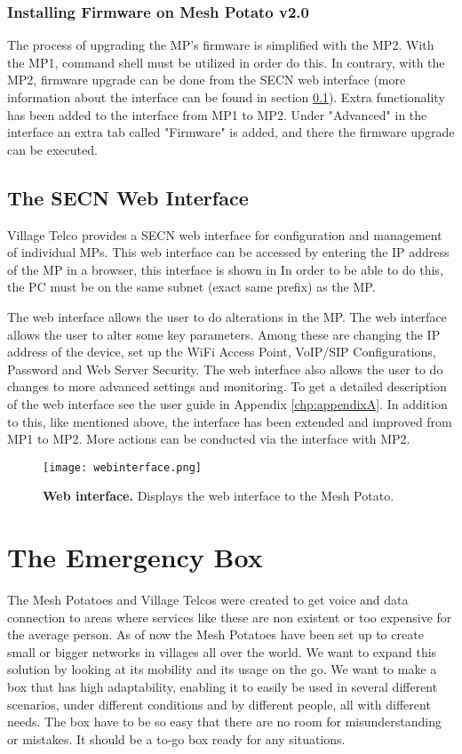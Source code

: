 \subsubsection{Installing Firmware on Mesh Potato v2.0}
The process of upgrading the MP's firmware is simplified with the MP2. With the MP1, command shell must be utilized in order do this. In contrary, with the MP2, firmware upgrade can be done from the SECN web interface (more information about the interface can be found in section \ref{subsec:interface}). Extra functionality has been added to the interface from MP1 to MP2. Under "Advanced" in the interface an extra tab called "Firmware" is added, and there the firmware upgrade can be executed. 

\subsection{The SECN Web Interface}
\label{subsec:interface}
Village Telco provides a SECN web interface for configuration and management of individual MPs. This web interface can be accessed by entering the IP address of the MP in a browser, this interface is shown in  In order to be able to do this, the PC must be on the same subnet (exact same prefix) as the MP.  

The web interface allows the user to do alterations in the MP. The web interface allows the user to alter some key parameters. Among these are changing the IP address of the device, set up the WiFi Access Point, VoIP/SIP Configurations, Password and Web Server Security. The web interface also allows the user to do changes to more advanced settings and monitoring. To get a detailed description of the web interface see the user guide in Appendix \ref{chp:appendixA}. In addition to this, like mentioned above, the interface has been extended and improved from MP1 to MP2. More actions can be conducted via the interface with MP2. 

\begin{figure}[t]
  \centering
      \texttt{[image: webinterface.png]}
  \caption [Web interface]{\textbf{Web interface.} Displays the web interface to the Mesh Potato.}
  \label{fig:webinterface}
\end{figure}


\section{The Emergency Box}
The Mesh Potatoes and Village Telcos were created to get voice and data connection to areas where services like these are non existent or too expensive for the average person. As of now the Mesh Potatoes have been set up to create small or bigger networks in villages all over the world. We want to expand this solution by looking at its mobility and its usage on the go. We want to make a box that has high adaptability, enabling it to easily be used in several different scenarios, under different conditions and by different people, all with different needs. The box have to be so easy that there are no room for misunderstanding or mistakes. It should be a to-go box ready for any situations.  
 

